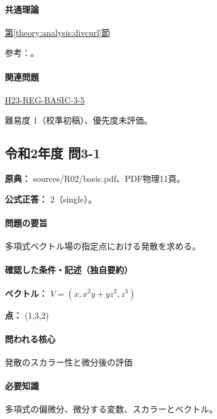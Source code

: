 \paragraph{共通理論} \hyperref[theory:analysis:divcurl]{第\ref*{theory:analysis:divcurl}節}

\par 参考：\cite{mit_vectorcalc2005}。

\paragraph{関連問題} \hyperref[q:h23-reg-basic-3-5]{H23-REG-BASIC-3-5}

\par 難易度 1（校準初稿）、優先度未評価。

\subsection{令和2年度 問3-1}
\label{q:r02-reg-basic-3-1}

\noindent\textbf{原典：} sources/R02/basic.pdf、PDF物理11頁。

\textbf{公式正答：} 2（single）。

\paragraph{問題の要旨} 多項式ベクトル場の指定点における発散を求める。

\paragraph{確認した条件・記述（独自要約）}\mbox{}\par

\noindent\textbf{ベクトル：} \(V=(x,x^2y+yz^2,z^3)\)\par

\noindent\textbf{点：} (1,3,2)\par

\paragraph{問われる核心} 発散のスカラー性と微分後の評価

\paragraph{必要知識} 多項式の偏微分、微分する変数、スカラーとベクトル。

